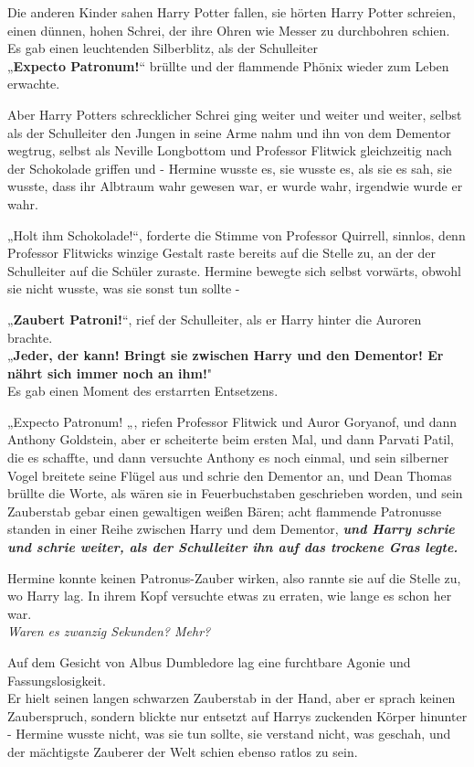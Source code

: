 {Die anderen Kinder sahen Harry Potter fallen, sie hörten Harry Potter schreien, einen dünnen, hohen Schrei, der ihre Ohren wie Messer zu durchbohren schien.\\ Es gab einen leuchtenden Silberblitz, als der Schulleiter\\ „\textbf{Expecto Patronum!}“ brüllte und der flammende Phönix wieder zum Leben erwachte.

Aber Harry Potters schrecklicher Schrei ging weiter und weiter und weiter, selbst als der Schulleiter den Jungen in seine Arme nahm und ihn von dem Dementor wegtrug, selbst als Neville Longbottom und Professor Flitwick gleichzeitig nach der Schokolade griffen und - Hermine wusste es, sie wusste es, als sie es sah, sie wusste, dass ihr Albtraum wahr gewesen war, er wurde wahr, irgendwie wurde er wahr.

„Holt ihm Schokolade!“, forderte die Stimme von Professor Quirrell, sinnlos, denn Professor Flitwicks winzige Gestalt raste bereits auf die Stelle zu, an der der Schulleiter auf die Schüler zuraste. Hermine bewegte sich selbst vorwärts, obwohl sie nicht wusste, was sie sonst tun sollte -

„\textbf{Zaubert Patroni!}“, rief der Schulleiter, als er Harry hinter die Auroren brachte.\\ „\textbf{Jeder, der kann! Bringt sie zwischen Harry und den Dementor! Er nährt sich immer noch an ihm!}"\\ Es gab einen Moment des erstarrten Entsetzens.

„Expecto Patronum! „, riefen Professor Flitwick und Auror Goryanof, und dann Anthony Goldstein, aber er scheiterte beim ersten Mal, und dann Parvati Patil, die es schaffte, und dann versuchte Anthony es noch einmal, und sein silberner Vogel breitete seine Flügel aus und schrie den Dementor an, und Dean Thomas brüllte die Worte, als wären sie in Feuerbuchstaben geschrieben worden, und sein Zauberstab gebar einen gewaltigen weißen Bären; acht flammende Patronusse standen in einer Reihe zwischen Harry und dem Dementor, \textbf{\emph{und Harry schrie und schrie weiter, als der Schulleiter ihn auf das trockene Gras legte.}}

Hermine konnte keinen Patronus-Zauber wirken, also rannte sie auf die Stelle zu, wo Harry lag. In ihrem Kopf versuchte etwas zu erraten, wie lange es schon her war.\\ \emph{Waren es zwanzig Sekunden? Mehr?}

Auf dem Gesicht von Albus Dumbledore lag eine furchtbare Agonie und Fassungslosigkeit.\\ Er hielt seinen langen schwarzen Zauberstab in der Hand, aber er sprach keinen Zauberspruch, sondern blickte nur entsetzt auf Harrys zuckenden Körper hinunter - Hermine wusste nicht, was sie tun sollte, sie verstand nicht, was geschah, und der mächtigste Zauberer der Welt schien ebenso ratlos zu sein.

}
